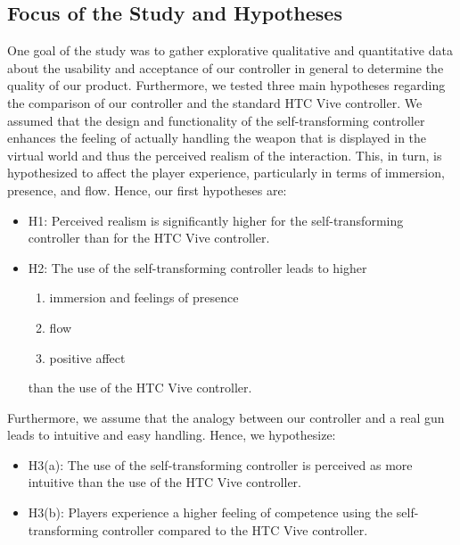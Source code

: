 \documentclass{sigchi}
\begin{document}
\subsection{Focus of the Study and Hypotheses}
One goal of the study was to gather explorative qualitative and quantitative data about the usability and acceptance of our controller in general 
to determine the quality of our product. Furthermore, we tested three main hypotheses regarding the comparison of our controller and the standard HTC Vive controller. We assumed that the design and functionality of the self-transforming controller enhances the feeling of actually handling the weapon that is displayed in the virtual world and thus the perceived realism of the interaction. This, in turn, is hypothesized to affect the player experience, particularly in terms of immersion, presence, and flow. Hence, our first hypotheses are:
\begin{itemize}
  \setlength{\itemsep}{2pt}
  \setlength{\parskip}{0pt}
  \setlength{\parsep}{0pt}
\item H1: Perceived realism is significantly higher for the self-transforming controller than for the HTC Vive controller. %
\item H2: The use of the self-transforming controller leads to higher 
\begin{enumerate}[label=(\alph*)]
  \setlength{\itemsep}{1pt}
  \setlength{\parskip}{0pt}
  \setlength{\parsep}{0pt}
\item immersion and feelings of presence
\item flow
\item positive affect
\end{enumerate}

than the use of the HTC Vive controller.
\end{itemize}
Furthermore, we assume that the analogy between our controller and a real gun leads to intuitive and easy handling. Hence, we hypothesize:
\begin{itemize}
  \setlength{\itemsep}{2pt}
  \setlength{\parskip}{0pt}
  \setlength{\parsep}{0pt}
\item H3(a): The use of the self-transforming controller is perceived as more intuitive than the use of the HTC Vive controller. %
\item H3(b): Players experience a higher feeling of competence using the self-transforming controller compared to the HTC Vive controller.
\end{itemize}
\end{document}

